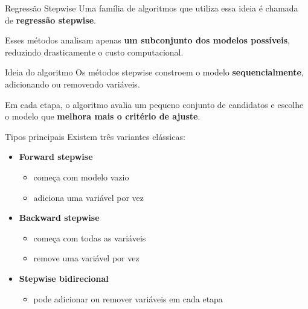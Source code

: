 \documentclass[
  ignorenonframetext,
  aspectratio=169,
]{beamer}
\providecommand{\tightlist}{%
  \setlength{\itemsep}{0pt}\setlength{\parskip}{0pt}}
\begin{document}
\begin{frame}{Regressão Stepwise}
\label{regressuxe3o-stepwise}
Uma família de algoritmos que utiliza essa ideia é chamada de
\textbf{regressão stepwise}.

Esses métodos analisam apenas \textbf{um subconjunto dos modelos
possíveis}, reduzindo drasticamente o custo computacional.

\begin{block}{Ideia do algoritmo}
\label{ideia-do-algoritmo}
Os métodos stepwise constroem o modelo \textbf{sequencialmente},
adicionando ou removendo variáveis.

Em cada etapa, o algoritmo avalia um pequeno conjunto de candidatos e
escolhe o modelo que \textbf{melhora mais o critério de ajuste}.
\end{block}
\end{frame}

\begin{frame}
\begin{block}{Tipos principais}
\label{tipos-principais}
Existem três variantes clássicas:

\begin{itemize}
\tightlist
\item
  \textbf{Forward stepwise}

  \begin{itemize}
  \tightlist
  \item
    começa com modelo vazio
  \item
    adiciona uma variável por vez
  \end{itemize}
\item
  \textbf{Backward stepwise}

  \begin{itemize}
  \tightlist
  \item
    começa com todas as variáveis
  \item
    remove uma variável por vez
  \end{itemize}
\item
  \textbf{Stepwise bidirecional}

  \begin{itemize}
  \tightlist
  \item
    pode adicionar ou remover variáveis em cada etapa
  \end{itemize}
\end{itemize}
\end{block}
\end{frame}
\end{document}
